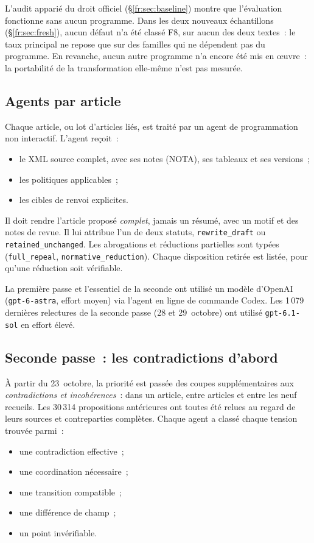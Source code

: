 \documentclass[11pt,a4paper]{article}
\begin{document}
L'audit apparié du droit officiel (\S\ref{fr:sec:baseline}) montre que l'évaluation fonctionne sans aucun programme. Dans les deux nouveaux échantillons (\S\ref{fr:sec:fresh}), aucun défaut n'a été classé F8, sur aucun des deux textes~: le taux principal ne repose que sur des familles qui ne dépendent pas du programme. En revanche, aucun autre programme n'a encore été mis en \oe{}uvre~: la portabilité de la transformation elle-même n'est pas mesurée.

\subsection{Agents par article}

Chaque article, ou lot d'articles liés, est traité par un agent de programmation non interactif. L'agent reçoit~:
\begin{itemize}
  \item le XML source complet, avec ses notes (NOTA), ses tableaux et ses versions~;
  \item les politiques applicables~;
  \item les cibles de renvoi explicites.
\end{itemize}
Il doit rendre l'article proposé \emph{complet}, jamais un résumé, avec un motif et des notes de revue. Il lui attribue l'un de deux statuts, \texttt{rewrite\_draft} ou \texttt{retained\_unchanged}. Les abrogations et réductions partielles sont typées (\texttt{full\_repeal}, \texttt{normative\_reduction}). Chaque disposition retirée est listée, pour qu'une réduction soit vérifiable.

La première passe et l'essentiel de la seconde ont utilisé un modèle d'OpenAI (\texttt{gpt-6-astra}, effort moyen) via l'agent en ligne de commande Codex. Les 1\,079 dernières relectures de la seconde passe (28 et 29~octobre) ont utilisé \texttt{gpt-6.1-sol} en effort élevé.

\subsection{Seconde passe~: les contradictions d'abord}

À partir du 23~octobre, la priorité est passée des coupes supplémentaires aux \emph{contradictions et incohérences}~: dans un article, entre articles et entre les neuf recueils. Les 30\,314 propositions antérieures ont toutes été relues au regard de leurs sources et contreparties complètes. Chaque agent a classé chaque tension trouvée parmi~:
\begin{itemize}
  \item une contradiction effective~;
  \item une coordination nécessaire~;
  \item une transition compatible~;
  \item une différence de champ~;
  \item un point invérifiable.
\end{itemize}
\end{document}
